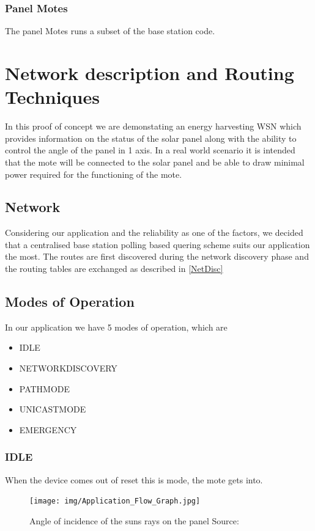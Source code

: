 \documentclass[conference]{IEEEtran}
\begin{document}
\subsubsection{Panel Motes}
    The panel Motes runs a subset of the base station code.

\section{Network description and Routing Techniques}
In this proof of concept we are demonstating an energy harvesting WSN which provides information on the status of the solar panel along with the ability to control the angle of the panel in 1 axis. In a real world scenario it is intended that the mote\cite{REmote} will be connected to the solar panel and be able to draw minimal power required for the functioning of the mote.
\subsection{Network}
Considering our application and the reliability as one of the factors, we decided that a centralised base station polling based quering scheme suits our application the most. The routes are first discovered during the network discovery phase and the routing tables are exchanged as described in \ref{NetDisc}

\subsection{Modes of Operation}
In our application we have 5 modes of operation, which are 
\begin{itemize}
    \item IDLE
    \item NETWORKDISCOVERY
    \item PATHMODE
    \item UNICASTMODE
    \item EMERGENCY
\end{itemize}


\subsubsection{IDLE} \label{IDLEMODE}
When the device comes out of reset this is mode, the mote gets into.

\begin{figure}[htbp]
    \texttt{[image: img/Application\_Flow\_Graph.jpg]}\centering
    \captionsetup{justification=centering}
    \caption{Angle of incidence of the suns rays on the panel Source: \cite{b2}}
    \label{fig:StateMachine}
\end{figure}
\end{document}
